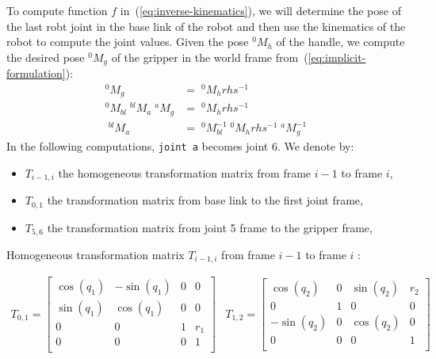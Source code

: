 \documentclass{article}
\begin{document}
To compute function $f$ in~(\ref{eq:inverse-kinematics}), we will determine the pose of the last robt joint in the base link of the robot and then use the kinematics of the robot to compute the joint values. Given the pose $^0M_h$ of the handle, we compute the desired pose $^0M_g$ of the gripper in the world frame from~(\ref{eq:implicit-formulation}):
\begin{align*}
  ^0M_g &= \;^0M_h rhs^{-1}\\
  ^0M_{bl}\;^{bl}M_a\;^aM_g &= \;^0M_h rhs^{-1} \\
  \;^{bl}M_a &= \;^0M_{bl}^{-1}\;^0M_h rhs^{-1} \;^aM_g^{-1}
\end{align*}
In the following computations, \texttt{joint a} becomes joint 6. We denote by:
\begin{itemize}
\item $T_{i-1,i}$ the homogeneous transformation matrix from frame $i-1$ to frame $i$,\\
\item $T_{0,1}$ the transformation matrix from base link to the first joint frame,\\
\item $T_{5,6}$ the transformation matrix from joint 5 frame to the gripper frame,\\
\end{itemize}
Homogeneous transformation matrix  $T_{i-1,i}$  from frame $i-1$  to frame $i$  :

\[
\begin{array}{cc}
T_{0,1} =
\begin{bmatrix}
  \cos(q_1) & -\sin(q_1) & 0 & 0 \\
  \sin(q_1) & \cos(q_1) & 0 & 0 \\
  0 & 0 & 1 & r_1 \\
  0 & 0 & 0 & 1 \\

\end{bmatrix}

&

T_{1,2} =
\begin{bmatrix}
  \cos(q_2) & 0 & \sin(q_2) & r_2 \\
  0 & 1 & 0 & 0 \\
  -\sin(q_2) & 0 & \cos(q_2) & 0 \\
  0 & 0 & 0 & 1 \\

\end{bmatrix}
\end{array}
\]
\end{document}
